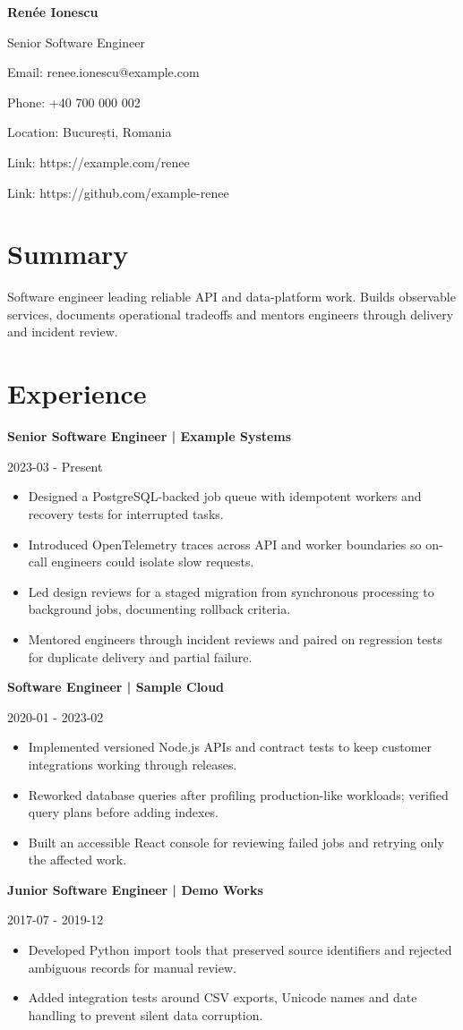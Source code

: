 \documentclass[11pt,a4paper]{article}
\begin{document}
{\LARGE\bfseries Renée Ionescu}\par
Senior Software Engineer\par
Email: renee.ionescu@example.com\par
Phone: +40 700 000 002\par
Location: București, Romania\par
Link: https://example.com/renee\par
Link: https://github.com/example-renee\par
\section*{Summary}
Software engineer leading reliable API and data-platform work. Builds observable services, documents operational tradeoffs and mentors engineers through delivery and incident review.
\section*{Experience}
\textbf{Senior Software Engineer | Example Systems}\par
2023-03 - Present\par
\begin{itemize}
\item Designed a PostgreSQL-backed job queue with idempotent workers and recovery tests for interrupted tasks.
\item Introduced OpenTelemetry traces across API and worker boundaries so on-call engineers could isolate slow requests.
\item Led design reviews for a staged migration from synchronous processing to background jobs, documenting rollback criteria.
\item Mentored engineers through incident reviews and paired on regression tests for duplicate delivery and partial failure.
\end{itemize}
\textbf{Software Engineer | Sample Cloud}\par
2020-01 - 2023-02\par
\begin{itemize}
\item Implemented versioned Node.js APIs and contract tests to keep customer integrations working through releases.
\item Reworked database queries after profiling production-like workloads; verified query plans before adding indexes.
\item Built an accessible React console for reviewing failed jobs and retrying only the affected work.
\end{itemize}
\textbf{Junior Software Engineer | Demo Works}\par
2017-07 - 2019-12\par
\begin{itemize}
\item Developed Python import tools that preserved source identifiers and rejected ambiguous records for manual review.
\item Added integration tests around CSV exports, Unicode names and date handling to prevent silent data corruption.
\end{itemize}
\end{document}
